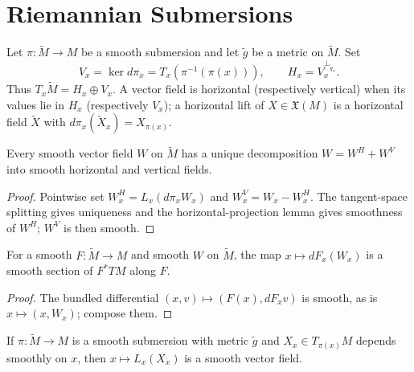\section{Riemannian Submersions}

Let $\pi:\tilde M\to M$ be a smooth submersion and let $\tilde g$ be a metric on $\tilde M$. Set
\[
V_x=\ker d\pi_x=T_x(\pi^{-1}(\pi(x))),\qquad H_x=V_x^{\perp_{\tilde g_x}}.
\]
Thus $T_x\tilde M=H_x\oplus V_x$. A vector field is horizontal (respectively vertical) when its values lie in $H_x$ (respectively $V_x$); a horizontal lift of $X\in\mathfrak X(M)$ is a horizontal field $\tilde X$ with $d\pi_x(\tilde X_x)=X_{\pi(x)}$.

\begin{proposition}
\label{prop:horizontal-vector-field-properties}
\leanok
{}
Every smooth vector field $W$ on $\tilde M$ has a unique decomposition $W=W^H+W^V$ into smooth horizontal and vertical fields.
\end{proposition}

\begin{proof}
\leanok
\sketch Pointwise set $W_x^H=L_x(d\pi_xW_x)$ and $W_x^V=W_x-W_x^H$. The tangent-space splitting gives uniqueness and the horizontal-projection lemma gives smoothness of $W^H$; $W^V$ is then smooth.
\end{proof}

\begin{lemma}
\label{lem:pushforward-along-map-smooth}
\leanok
{}
For a smooth $F:\tilde M\to M$ and smooth $W$ on $\tilde M$, the map $x\mapsto dF_x(W_x)$ is a smooth section of $F^*TM$ along $F$.
\end{lemma}

\begin{proof}
\leanok
\sketch The bundled differential $(x,v)\mapsto(F(x),dF_xv)$ is smooth, as is $x\mapsto(x,W_x)$; compose them.
\end{proof}

\begin{lemma}
\label{lem:horizontal-lift-along-smooth}
\leanok
{}
If $\pi:\tilde M\to M$ is a smooth submersion with metric $\tilde g$ and $X_x\in T_{\pi(x)}M$ depends smoothly on $x$, then $x\mapsto L_x(X_x)$ is a smooth vector field.
\end{lemma}

